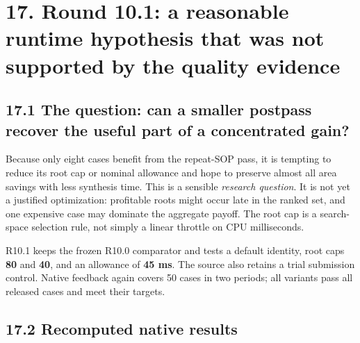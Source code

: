 \section{17. Round 10.1: a reasonable runtime hypothesis that was not supported by the quality evidence}\label{round-10.1-a-reasonable-runtime-hypothesis-that-was-not-supported-by-the-quality-evidence}

\subsection{17.1 The question: can a smaller postpass recover the useful part of a concentrated gain?}\label{the-question-can-a-smaller-postpass-recover-the-useful-part-of-a-concentrated-gain}

Because only eight cases benefit from the repeat-SOP pass, it is tempting to reduce its root cap or nominal allowance and hope to preserve almost all area savings with less synthesis time. This is a sensible \emph{research question}. It is not yet a justified optimization: profitable roots might occur late in the ranked set, and one expensive case may dominate the aggregate payoff. The root cap is a search-space selection rule, not simply a linear throttle on CPU milliseconds.

R10.1 keeps the frozen R10.0 comparator and tests a default identity, root caps \textbf{80} and \textbf{40}, and an allowance of \textbf{45 ms}. The source also retains a trial submission control. Native feedback again covers 50 cases in two periods; all variants pass all released cases and meet their targets.

\subsection{17.2 Recomputed native results}\label{recomputed-native-results}

